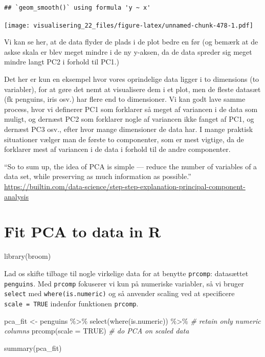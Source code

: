 \documentclass[
]{book}
\newenvironment{Shaded}{\begin{snugshade}}{\end{snugshade}}
\newcommand{\AttributeTok}[1]{\textcolor[rgb]{0.77,0.63,0.00}{#1}}
\newcommand{\CommentTok}[1]{\textcolor[rgb]{0.56,0.35,0.01}{\textit{#1}}}
\newcommand{\ConstantTok}[1]{\textcolor[rgb]{0.00,0.00,0.00}{#1}}
\newcommand{\FunctionTok}[1]{\textcolor[rgb]{0.00,0.00,0.00}{#1}}
\newcommand{\NormalTok}[1]{#1}
\newcommand{\OtherTok}[1]{\textcolor[rgb]{0.56,0.35,0.01}{#1}}
\newcommand{\SpecialCharTok}[1]{\textcolor[rgb]{0.00,0.00,0.00}{#1}}
\begin{document}
\begin{verbatim}
## `geom_smooth()` using formula 'y ~ x'
\end{verbatim}

\texttt{[image: visualisering\_22\_files/figure-latex/unnamed-chunk-478-1.pdf]}

Vi kan se her, at de data flyder de plads i de plot bedre en før (og bemærk at de askse skala er blev meget mindre i de ny y-aksen, da de data spreder sig meget mindre langt PC2 i forhold til PC1.)

Det her er kun en eksempel hvor vores oprindelige data ligger i to dimensions (to variabler), for at gøre det nemt at visualisere dem i et plot, men de fleste datasæt (fk penguins, iris osv.) har flere end to dimensioner. Vi kan godt lave samme process, hvor vi definerer PC1 som forklarer så meget af variancen i de data som muligt, og dernæst PC2 som forklarer nogle af variancen ikke fanget af PC1, og dernæst PC3 osv., efter hvor mange dimensioner de data har. I mange praktisk situationer vælger man de første to componenter, som er mest vigtige, da de forklarer mest af variancen i de data i forhold til de andre componenter.

``So to sum up, the idea of PCA is simple --- reduce the number of variables of a data set, while preserving as much information as possible.''
\url{https://builtin.com/data-science/step-step-explanation-principal-component-analysis}

\hypertarget{fit-pca-to-data-in-r}{%
\section{Fit PCA to data in R}\label{fit-pca-to-data-in-r}}

\begin{Shaded}
\begin{Highlighting}[]
\FunctionTok{library}\NormalTok{(broom)}
\end{Highlighting}
\end{Shaded}

Lad os skifte tilbage til nogle virkelige data for at benytte \texttt{prcomp}: datasættet \texttt{penguins}. Med \texttt{prcomp} fokuserer vi kun på numeriske variabler, så vi bruger \texttt{select} med \texttt{where(is.numeric)} og så anvender scaling ved at specificere \texttt{scale\ =\ TRUE} indenfor funktionen \texttt{prcomp}.

\begin{Shaded}
\begin{Highlighting}[]
\NormalTok{pca\_fit }\OtherTok{\textless{}{-}}\NormalTok{ penguins }\SpecialCharTok{\%\textgreater{}\%}
  \FunctionTok{select}\NormalTok{(}\FunctionTok{where}\NormalTok{(is.numeric)) }\SpecialCharTok{\%\textgreater{}\%} \CommentTok{\# retain only numeric columns}
  \FunctionTok{prcomp}\NormalTok{(}\AttributeTok{scale =} \ConstantTok{TRUE}\NormalTok{) }\CommentTok{\# do PCA on scaled data}

\FunctionTok{summary}\NormalTok{(pca\_fit)}
\end{Highlighting}
\end{Shaded}
\end{document}
